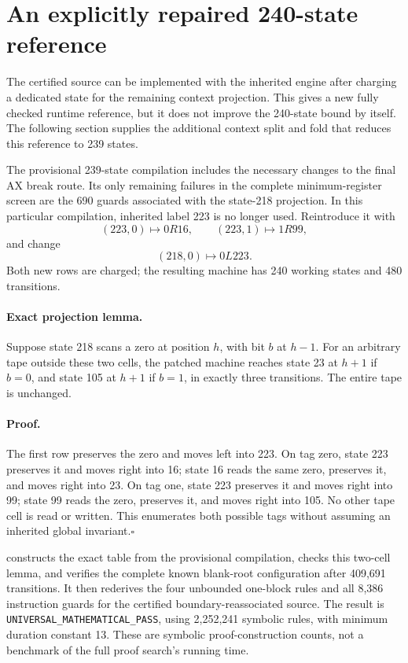 \section{An explicitly repaired 240-state reference}
\label{sec:boundary240}

The certified source can be implemented with the inherited engine after
charging a dedicated state for the remaining context projection.  This
gives a new fully checked runtime reference, but it does not improve the
240-state bound by itself.  The following section supplies the additional
context split and fold that reduces this reference to 239 states.

The provisional 239-state compilation includes the necessary changes to
the final AX break route.  Its only remaining failures in the complete
minimum-register screen are the 690 guards associated with the state-218
projection.  In this particular compilation, inherited label 223 is no
longer used.  Reintroduce it with
\[
 (223,0)\mapsto0R16,\qquad(223,1)\mapsto1R99,
\]
and change
\[
 (218,0)\mapsto0L223.
\]
Both new rows are charged; the resulting machine has 240 working states
and 480 transitions.

\paragraph{Exact projection lemma.}
Suppose state 218 scans a zero at position $h$, with bit $b$ at $h-1$.
For an arbitrary tape outside these two cells, the patched machine reaches
state 23 at $h+1$ if $b=0$, and state 105 at $h+1$ if $b=1$, in exactly
three transitions.  The entire tape is unchanged.

\paragraph{Proof.}
The first row preserves the zero and moves left into 223.  On tag zero,
state 223 preserves it and moves right into 16; state 16 reads the same
zero, preserves it, and moves right into 23.  On tag one, state 223
preserves it and moves right into 99; state 99 reads the zero, preserves
it, and moves right into 105.  No other tape cell is read or written.
This enumerates both possible tags without assuming an inherited global
invariant.\hfill$\square$

 constructs the exact table from
the provisional compilation, checks this two-cell lemma, and verifies the
complete known blank-root configuration after 409,691 transitions.  It
then rederives the four unbounded one-block rules and all 8,386 instruction
guards for the certified boundary-reassociated source.  The result is
\texttt{UNIVERSAL\_MATHEMATICAL\_PASS}, using 2,252,241 symbolic rules,
with minimum duration constant 13.  These are symbolic proof-construction
counts, not a benchmark of the full proof search's running time.

